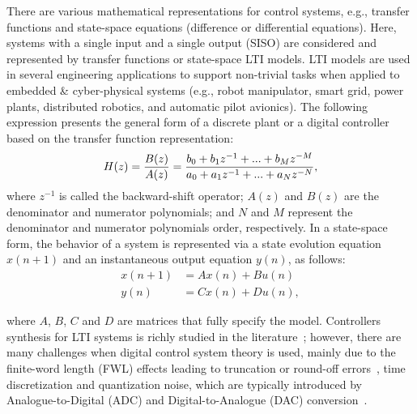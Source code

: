\documentclass[10pt,conference]{IEEEtran}
\begin{document}


There are various mathematical representations for control 
systems,  e.g.,  transfer functions and state-space equations (difference or differential equations). 
Here, 
systems with a single input and a single output (SISO) are considered and 
represented by transfer functions or state-space LTI models. LTI models 
are used in several engineering applications to support non-trivial tasks when 
applied to embedded \& cyber-physical systems (e.g., robot manipulator, smart grid, 
power plants, distributed robotics, and automatic pilot avionics). 
The following expression presents the general form 
of a discrete plant or a digital controller based on the transfer function representation:
%
\begin{equation}
\small
\label{eq:transferfunction}
H(z)=\frac{B(z)}{A(z)}=\frac{b_{0}+b_{1}z^{-1}+...+b_{M}z^{-M}}{a_{0}+a_{1}z^{-1}+...+a_{N}z^{-N}},
\end{equation}
%
\noindent where $z^{-1}$ is called the backward-shift operator; $A(z)$ and $B(z)$ are 
the denominator and numerator polynomials; and $N$ and $M$
represent the denominator and numerator polynomials order, respectively.
%
In a state-space form, 
the behavior of a system is represented via a state evolution equation $x(n+1)$ and an instantaneous 
output equation $y(n)$, as follows:
%
\begin{equation}
\begin{split}
x(n+1) &= A x(n) + B u(n)
\\
y(n) &= C x(n) + D u(n), 
\end{split}\label{eq:ss-example}
\end{equation}

\noindent where $A$, $B$, $C$ and $D$ are matrices that fully specify the model. 
%
Controllers synthesis for LTI systems is richly studied 
in the literature~\cite{mazo2010pessoa,DBLP:conf/emsoft/RavanbakhshS16,economakos2016automated}; 
however, there are many challenges when 
digital control system theory is used, mainly due to the finite-word 
length (FWL) effects leading to truncation 
or round-off errors~\cite{Guang2013, Istepanian2001}, time discretization 
and quantization noise, which are typically introduced by Analogue-to-Digital 
(ADC) and Digital-to-Analogue (DAC) conversion~\cite{astrom1997computer}. 
\end{document}
